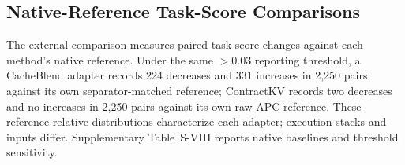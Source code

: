 \subsection{Native-Reference Task-Score Comparisons}
\label{sec:s-external-reference}
The external comparison measures paired task-score changes against each method's native reference. Under the same $>0.03$ reporting threshold, a CacheBlend adapter records 224 decreases and 331 increases in 2,250 pairs against its own separator-matched reference; ContractKV records two decreases and no increases in 2,250 pairs against its own raw APC reference. These reference-relative distributions characterize each adapter; execution stacks and inputs differ. Supplementary Table~S-VIII reports native baselines and threshold sensitivity.
